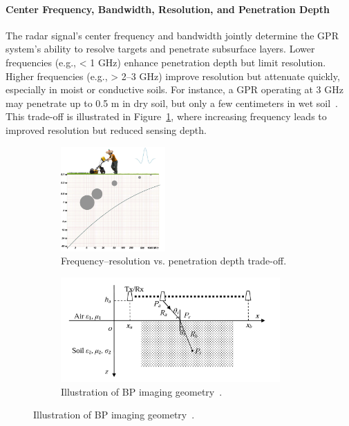 \paragraph{Center Frequency, Bandwidth, Resolution, and Penetration Depth}

The radar signal’s center frequency and bandwidth jointly determine the GPR system’s ability to resolve targets and penetrate subsurface layers. Lower frequencies (e.g., < 1 GHz) enhance penetration depth but limit resolution. Higher frequencies (e.g., > 2--3 GHz) improve resolution but attenuate quickly, especially in moist or conductive soils. For instance, a GPR operating at 3 GHz may penetrate up to 0.5 m in dry soil, but only a few centimeters in wet soil~\cite{alqudsi2021review}. This trade-off is illustrated in Figure~\ref{fig:freq_tradeoff}, where increasing frequency leads to improved resolution but reduced sensing depth.

\begin{figure}[h!]
    \centering
    \begin{subfigure}[b]{0.48\linewidth}
        \centering
        \includegraphics[height=4cm]{figs/Huirui/freq_tradeoff.png}
        \caption{Frequency–resolution vs. penetration depth trade-off\protect\footnotemark.}
        \label{fig:freq_tradeoff}
    \end{subfigure}
    \hfill
    \begin{subfigure}[b]{0.48\linewidth}
        \centering
        \includegraphics[height=4cm]{figs/Huirui/bp_geometry.png}
        \caption{Illustration of BP imaging geometry~\cite{lei2014multi}.}
        \label{fig:bp_geometry}
    \end{subfigure}
\end{figure}


